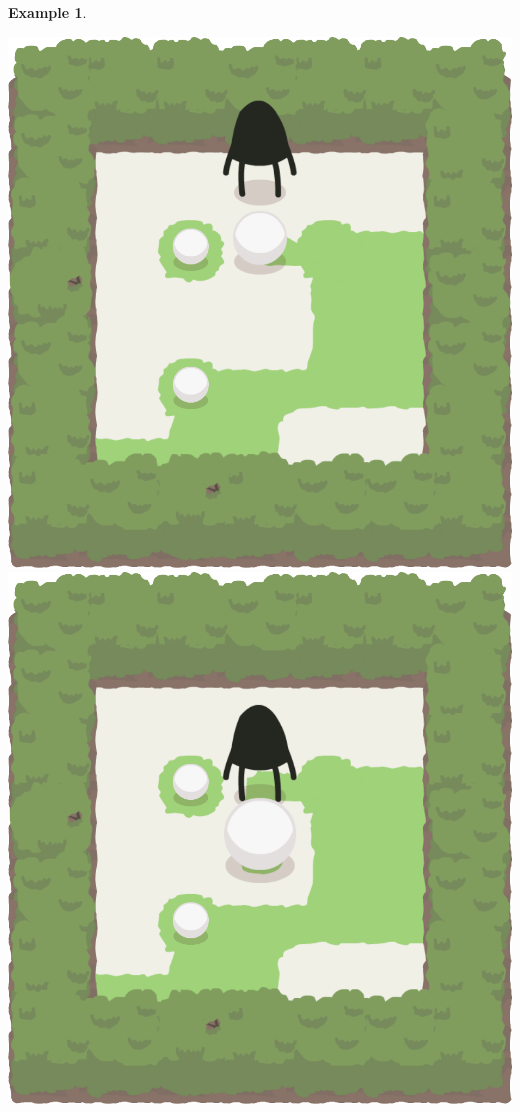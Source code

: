 \documentclass{report}
\theoremstyle{plain}
\newtheorem{example}{Example}[section]
\begin{document}
\begin{example}
\begin{center}
\includegraphics[width=\andyWidth\textwidth]{andy-basic-7.png} \quad
\includegraphics[width=\andyWidth\textwidth]{andy-basic-8.png}

\end{center}
\end{example}
\end{document}
